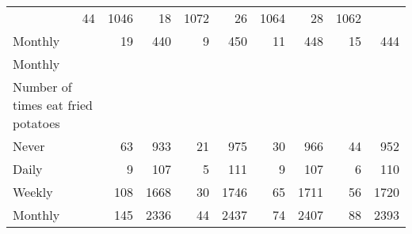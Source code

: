 \documentclass{article}
\begin{document}
\begin{tabular}{lllllllll}
  \multicolumn{1}{|r}{44} &
  \multicolumn{1}{r}{1046} &
  \multicolumn{1}{r}{18} &
  \multicolumn{1}{r}{1072} &
  \multicolumn{1}{r}{26} &
  \multicolumn{1}{r}{1064} &
  \multicolumn{1}{r}{28} &
  \multicolumn{1}{r}{1062} \\
\multicolumn{1}{l}{\hspace{5em}Monthly} &
  \multicolumn{1}{|r}{19} &
  \multicolumn{1}{r}{440} &
  \multicolumn{1}{r}{9} &
  \multicolumn{1}{r}{450} &
  \multicolumn{1}{r}{11} &
  \multicolumn{1}{r}{448} &
  \multicolumn{1}{r}{15} &
  \multicolumn{1}{r}{444} \\
\multicolumn{1}{l}{\hspace{3em}Monthly} &
  \multicolumn{1}{|r}{} &
  \multicolumn{1}{r}{} &
  \multicolumn{1}{r}{} &
  \multicolumn{1}{r}{} &
  \multicolumn{1}{r}{} &
  \multicolumn{1}{r}{} &
  \multicolumn{1}{r}{} &
  \multicolumn{1}{r}{} \\
\multicolumn{1}{l}{\hspace{4em}Number of times eat fried potatoes} &
  \multicolumn{1}{|r}{} &
  \multicolumn{1}{r}{} &
  \multicolumn{1}{r}{} &
  \multicolumn{1}{r}{} &
  \multicolumn{1}{r}{} &
  \multicolumn{1}{r}{} &
  \multicolumn{1}{r}{} &
  \multicolumn{1}{r}{} \\
\multicolumn{1}{l}{\hspace{5em}Never} &
  \multicolumn{1}{|r}{63} &
  \multicolumn{1}{r}{933} &
  \multicolumn{1}{r}{21} &
  \multicolumn{1}{r}{975} &
  \multicolumn{1}{r}{30} &
  \multicolumn{1}{r}{966} &
  \multicolumn{1}{r}{44} &
  \multicolumn{1}{r}{952} \\
\multicolumn{1}{l}{\hspace{5em}Daily} &
  \multicolumn{1}{|r}{9} &
  \multicolumn{1}{r}{107} &
  \multicolumn{1}{r}{5} &
  \multicolumn{1}{r}{111} &
  \multicolumn{1}{r}{9} &
  \multicolumn{1}{r}{107} &
  \multicolumn{1}{r}{6} &
  \multicolumn{1}{r}{110} \\
\multicolumn{1}{l}{\hspace{5em}Weekly} &
  \multicolumn{1}{|r}{108} &
  \multicolumn{1}{r}{1668} &
  \multicolumn{1}{r}{30} &
  \multicolumn{1}{r}{1746} &
  \multicolumn{1}{r}{65} &
  \multicolumn{1}{r}{1711} &
  \multicolumn{1}{r}{56} &
  \multicolumn{1}{r}{1720} \\
\multicolumn{1}{l}{\hspace{5em}Monthly} &
  \multicolumn{1}{|r}{145} &
  \multicolumn{1}{r}{2336} &
  \multicolumn{1}{r}{44} &
  \multicolumn{1}{r}{2437} &
  \multicolumn{1}{r}{74} &
  \multicolumn{1}{r}{2407} &
  \multicolumn{1}{r}{88} &
  \multicolumn{1}{r}{2393} \\

\end{tabular}
\end{document}
